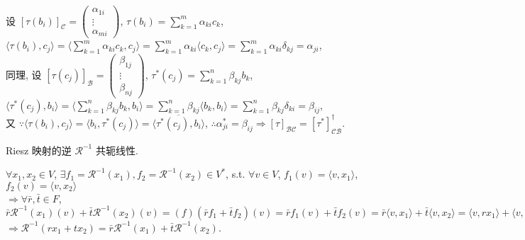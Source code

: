 \documentclass{note}
\begin{document}
\begin{pf}
\begin{itemize}
        设 $[\tau(b_i)]_{\mathcal{C}}=\begin{pmatrix}
            \alpha_{1i}\\
            \vdots\\
            \alpha_{mi}
        \end{pmatrix}$, $\tau(b_i)=\sum_{k=1}^m\alpha_{ki}c_k$, $\langle\tau(b_i),c_j\rangle=\langle\sum_{k=1}^m\alpha_{ki}c_k,c_j\rangle=\sum_{k=1}^m\alpha_{ki}\langle c_k,c_j\rangle=\sum_{k=1}^m\alpha_{ki}\delta_{kj}=\alpha_{ji}$,\\
        同理, 设 $[\tau(c_j)]_{\mathcal{B}}=\begin{pmatrix}
            \beta_{1j}\\
            \vdots\\
            \beta_{nj}
        \end{pmatrix}$, $\tau^*(c_j)=\sum_{k=1}^n\beta_{kj}b_k$, $\langle \tau^*(c_j),b_i\rangle=\langle\sum_{k=1}^n\beta_{kj}b_k,b_i\rangle=\sum_{k=1}^n\beta_{kj}\langle b_k,b_i\rangle=\sum_{k=1}^n\beta_{kj}\delta_{ki}=\beta_{ij}$,\\
        又 $\because\langle\tau(b_i),c_j\rangle=\langle b_i,\tau^*(c_j)\rangle=\overline{\langle\tau^*(c_j),b_i\rangle}$, $\therefore\alpha_{ji}^*=\beta_{ij}\Longrightarrow[\tau]_{\mathcal{BC}}=[\tau^*]_{\mathcal{CB}}^{\dagger}$.
    \end{itemize}
\end{pf}

\begin{cor}\label{inverse Riesz conjugate linear}
    Riesz 映射的逆 $\mathcal{R}^{-1}$ 共轭线性.
\end{cor}
\begin{pf}
    $\forall x_1,x_2\in V$, $\exists f_1=\mathcal{R}^{-1}(x_1),f_2=\mathcal{R}^{-1}(x_2)\in V^*$, s.t. $\forall v\in V$, $f_1(v)=\langle v,x_1\rangle$, $f_2(v)=\langle v,x_2\rangle$\\
    $\Longrightarrow\forall\bar{r},\bar{t}\in F$, $\bar{r}\mathcal{R}^{-1}(x_1)(v)+\bar{t}\mathcal{R}^{-1}(x_2)(v)=(f)(\bar{r}f_1+\bar{t}f_2)(v)=\bar{r}f_1(v)+\bar{t}f_2(v)=\bar{r}\langle v,x_1\rangle+\bar{t}\langle v,x_2\rangle=\langle v,rx_1\rangle+\langle v,tx_2\rangle=\langle v,rx_1+tx_2\rangle=\mathcal{R}^{-1}(rx_1+rx_2)$\\
    $\Longrightarrow\mathcal{R}^{-1}(rx_1+tx_2)=\bar{r}\mathcal{R}^{-1}(x_1)+\bar{t}\mathcal{R}^{-1}(x_2)$.
\end{pf}
\end{document}
